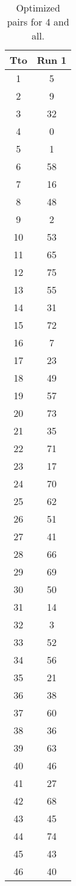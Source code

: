 \begin{table}
  \centering
  \scriptsize
  \caption{Optimized pairs for 4 and all.}
  \label{tab_pairs}
\begin{tabular}{c c }
\hline
Tto & Run 1 \\
\hline
1 & 5 \\
2 & 9 \\
3 & 32 \\
4 & 0 \\
5 & 1 \\
6 & 58 \\
7 & 16 \\
8 & 48 \\
9 & 2 \\
10 & 53 \\
11 & 65 \\
12 & 75 \\
13 & 55 \\
14 & 31 \\
15 & 72 \\
16 & 7 \\
17 & 23 \\
18 & 49 \\
19 & 57 \\
20 & 73 \\
21 & 35 \\
22 & 71 \\
23 & 17 \\
24 & 70 \\
25 & 62 \\
26 & 51 \\
27 & 41 \\
28 & 66 \\
29 & 69 \\
30 & 50 \\
31 & 14 \\
32 & 3 \\
33 & 52 \\
34 & 56 \\
35 & 21 \\
36 & 38 \\
37 & 60 \\
38 & 36 \\
39 & 63 \\
40 & 46 \\
41 & 27 \\
42 & 68 \\
43 & 45 \\
44 & 74 \\
45 & 43 \\
46 & 40 \\

\end{tabular}
\end{table}
